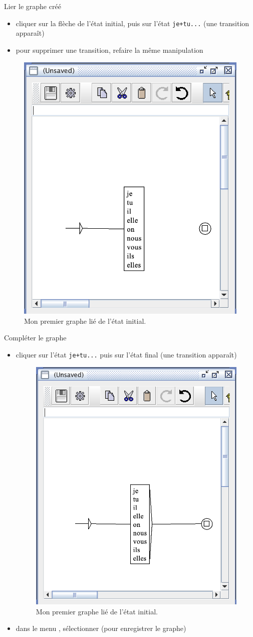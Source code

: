 \documentclass[xetex,xcolor={table,usenames,dvipsnames}]{beamer}
\begin{document}
\begin{frame}{Lier le graphe créé}
	\begin{itemize}
		\item cliquer sur la flèche de l'état initial, puis sur l'état \texttt{je+tu...} (une transition apparaît)
		\item pour supprimer une transition, refaire la même manipulation
	\end{itemize}
	\begin{figure}[h] %
		\centering
		\includegraphics[width=.35\linewidth]{img/graphe_lie.png}
		\caption{Mon premier graphe lié de l'état initial.}
		\label{fig:ling_out_TAL}
	\end{figure}
\end{frame}

\begin{frame}{Compléter le graphe}
	\begin{itemize}
		\item cliquer sur l'état \texttt{je+tu...} puis sur l'état final (une transition apparaît)
			\begin{figure}[h] %
			\centering
			\includegraphics[width=.3\linewidth]{img/graphe_fini.png}
			\caption{Mon premier graphe lié de l'état initial.}
			\label{fig:ling_out_TAL}
		\end{figure}
		\item dans le menu , sélectionner  (pour enregistrer le graphe)
	\end{itemize}
\end{frame}
\end{document}
